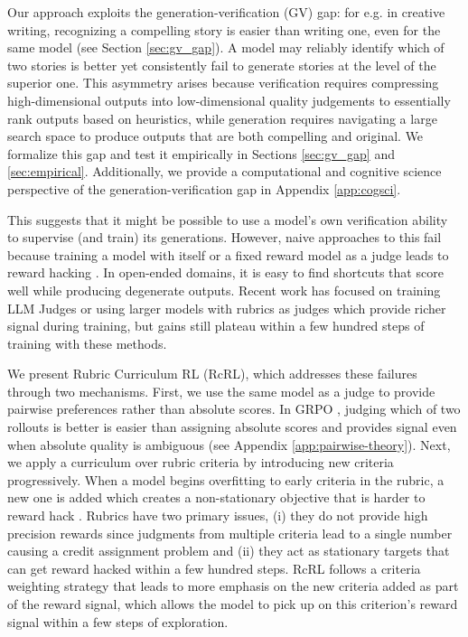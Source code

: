 \documentclass{article}
\theoremstyle{plain}
\theoremstyle{definition}
\theoremstyle{remark}
\begin{document}
Our approach exploits the generation-verification (GV) gap: for e.g. in creative writing, recognizing a compelling story is easier than writing one, even for the same model (see Section \ref{sec:gv_gap}). A model may reliably identify which of two stories is better yet consistently fail to generate stories at the level of the superior one. This asymmetry arises because verification requires compressing high-dimensional outputs into low-dimensional quality judgements to essentially rank outputs based on heuristics, while generation requires navigating a large search space to produce outputs that are both compelling and original. We formalize this gap and test it empirically in Sections \ref{sec:gv_gap} and \ref{sec:empirical}. Additionally, we provide a computational and cognitive science perspective of the generation-verification gap in Appendix \ref{app:cogsci}. 

This suggests that it might be possible to use a model’s own verification ability to supervise (and train) its generations. However, naive approaches to this fail because training a model with itself or a fixed reward model as a judge leads to reward hacking \citep{taylor2025schoolrewardhackshacking}. In open-ended domains, it is easy to find shortcuts that score well while producing degenerate outputs. Recent work has focused on training LLM Judges \citep{fein2025litbenchbenchmarkdatasetreliable} or using larger models with rubrics as judges \citep{gunjal2025rubricsrewardsreinforcementlearning} which provide richer signal during training, but gains still plateau within a few hundred steps of training with these methods.

We present Rubric Curriculum RL (RcRL), which addresses these failures through two mechanisms. First, we use the same model as a judge to provide pairwise preferences rather than absolute scores. In GRPO \citep{shao2024deepseekmath}, judging which of two rollouts is better is easier than assigning absolute scores and provides signal even when absolute quality is ambiguous (see Appendix \ref{app:pairwise-theory}). Next, we apply a curriculum over rubric criteria by introducing new criteria progressively. When a model begins overfitting to early criteria in the rubric, a new one is added which creates a non-stationary objective that is harder to reward hack \citep{gao2023scaling}. Rubrics have two primary issues, (i) they do not provide high precision rewards since judgments from multiple criteria lead to a single number causing a credit assignment problem and (ii) they act as stationary targets that can get reward hacked within a few hundred steps. RcRL follows a criteria weighting strategy that leads to more emphasis on the new criteria added as part of the reward signal, which allows the model to pick up on this criterion’s reward signal within a few steps of exploration.
\end{document}
